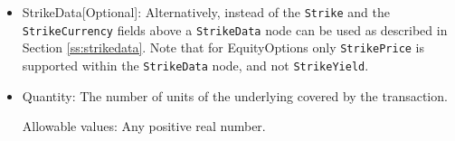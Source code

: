 \begin{itemize}
	
	\item StrikeData[Optional]: Alternatively, instead of the \lstinline!Strike! and the \lstinline!StrikeCurrency! fields above a \lstinline!StrikeData! node can be used as described in Section \ref{ss:strikedata}. Note that for EquityOptions only \lstinline!StrikePrice!  is supported within the \lstinline!StrikeData! node, and not \lstinline!StrikeYield!. 
	
	\item Quantity: The number of units of the underlying covered by the transaction. 
	
	Allowable values: Any positive real number.
\end{itemize}
